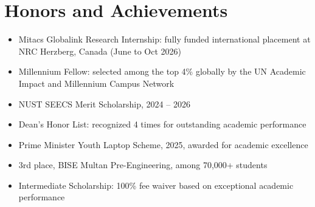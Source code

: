 \documentclass[letterpaper,11pt]{article}
\begin{document}
\section{Honors and Achievements}
 \begin{itemize}[leftmargin=0.15in, label={}]
    \small{\item{
     \begin{itemize}[leftmargin=0.15in]
       \item Mitacs Globalink Research Internship: fully funded international placement at NRC Herzberg, Canada (June to Oct 2026)
       \item Millennium Fellow: selected among the top 4\% globally by the UN Academic Impact and Millennium Campus Network
       \item NUST SEECS Merit Scholarship, 2024 -- 2026
       \item Dean's Honor List: recognized 4 times for outstanding academic performance
       \item Prime Minister Youth Laptop Scheme, 2025, awarded for academic excellence
       \item 3rd place, BISE Multan Pre-Engineering, among 70,000+ students
       \item Intermediate Scholarship: 100\% fee waiver based on exceptional academic performance
     \end{itemize}
    }}
 \end{itemize}
\end{document}
